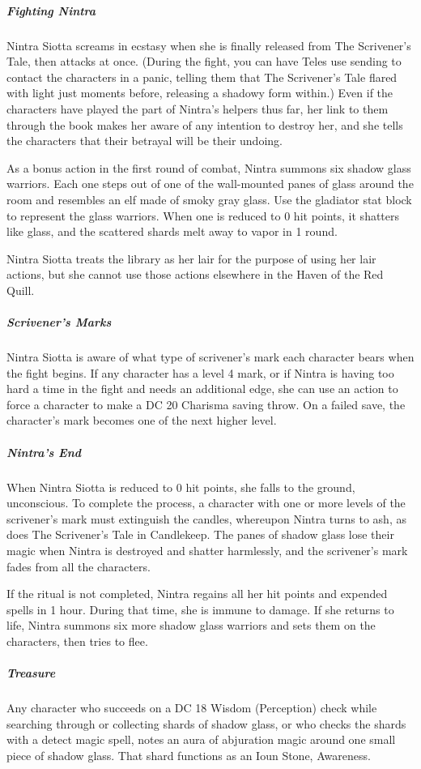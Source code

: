 \documentclass[10pt,a4paper,twoside,bg=print,twocolumn,openany,nodeprecatedcode]{dndbook}
\begin{document}
\subparagraph{Fighting Nintra}
Nintra Siotta screams in ecstasy when she is finally released from The Scrivener's Tale, then attacks at once. (During the fight, you can have Teles use sending to contact the characters in a panic, telling them that The Scrivener's Tale flared with light just moments before, releasing a shadowy form within.) Even if the characters have played the part of Nintra's helpers thus far, her link to them through the book makes her aware of any intention to destroy her, and she tells the characters that their betrayal will be their undoing.

As a bonus action in the first round of combat, Nintra summons six shadow glass warriors. Each one steps out of one of the wall-mounted panes of glass around the room and resembles an elf made of smoky gray glass. Use the gladiator stat block to represent the glass warriors. When one is reduced to 0 hit points, it shatters like glass, and the scattered shards melt away to vapor in 1 round.

Nintra Siotta treats the library as her lair for the purpose of using her lair actions, but she cannot use those actions elsewhere in the Haven of the Red Quill.

\subparagraph{Scrivener's Marks}
Nintra Siotta is aware of what type of scrivener's mark each character bears when the fight begins. If any character has a level 4 mark, or if Nintra is having too hard a time in the fight and needs an additional edge, she can use an action to force a character to make a DC 20 Charisma saving throw. On a failed save, the character's mark becomes one of the next higher level.

\subparagraph{Nintra's End}
When Nintra Siotta is reduced to 0 hit points, she falls to the ground, unconscious. To complete the process, a character with one or more levels of the scrivener's mark must extinguish the candles, whereupon Nintra turns to ash, as does The Scrivener's Tale in Candlekeep. The panes of shadow glass lose their magic when Nintra is destroyed and shatter harmlessly, and the scrivener's mark fades from all the characters.

If the ritual is not completed, Nintra regains all her hit points and expended spells in 1 hour. During that time, she is immune to damage. If she returns to life, Nintra summons six more shadow glass warriors and sets them on the characters, then tries to flee.

\subparagraph{Treasure}
Any character who succeeds on a DC 18 Wisdom (Perception) check while searching through or collecting shards of shadow glass, or who checks the shards with a detect magic spell, notes an aura of abjuration magic around one small piece of shadow glass. That shard functions as an Ioun Stone, Awareness.
\end{document}
